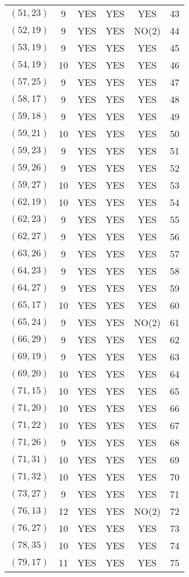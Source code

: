 \begin{longtable}{|c|c|c|c|c|c|}
$(51, 23)$ & 9 & YES & YES & YES & 43\\
$(52, 19)$ & 9 & YES & YES & NO(2) & 44\\
$(53, 19)$ & 9 & YES & YES & YES & 45\\
$(54, 19)$ & 10 & YES & YES & YES & 46\\
$(57, 25)$ & 9 & YES & YES & YES & 47\\
$(58, 17)$ & 9 & YES & YES & YES & 48\\
$(59, 18)$ & 9 & YES & YES & YES & 49\\
$(59, 21)$ & 10 & YES & YES & YES & 50\\
$(59, 23)$ & 9 & YES & YES & YES & 51\\
$(59, 26)$ & 9 & YES & YES & YES & 52\\
$(59, 27)$ & 10 & YES & YES & YES & 53\\
$(62, 19)$ & 10 & YES & YES & YES & 54\\
$(62, 23)$ & 9 & YES & YES & YES & 55\\
$(62, 27)$ & 9 & YES & YES & YES & 56\\
$(63, 26)$ & 9 & YES & YES & YES & 57\\
$(64, 23)$ & 9 & YES & YES & YES & 58\\
$(64, 27)$ & 9 & YES & YES & YES & 59\\
$(65, 17)$ & 10 & YES & YES & YES & 60\\
$(65, 24)$ & 9 & YES & YES & NO(2) & 61\\
$(66, 29)$ & 9 & YES & YES & YES & 62\\
$(69, 19)$ & 9 & YES & YES & YES & 63\\
$(69, 20)$ & 10 & YES & YES & YES & 64\\
$(71, 15)$ & 10 & YES & YES & YES & 65\\
$(71, 20)$ & 10 & YES & YES & YES & 66\\
$(71, 22)$ & 10 & YES & YES & YES & 67\\
$(71, 26)$ & 9 & YES & YES & YES & 68\\
$(71, 31)$ & 10 & YES & YES & YES & 69\\
$(71, 32)$ & 10 & YES & YES & YES & 70\\
$(73, 27)$ & 9 & YES & YES & YES & 71\\
$(76, 13)$ & 12 & YES & YES & NO(2) & 72\\
$(76, 27)$ & 10 & YES & YES & YES & 73\\
$(78, 35)$ & 10 & YES & YES & YES & 74\\
$(79, 17)$ & 11 & YES & YES & YES & 75\\

\end{longtable}
